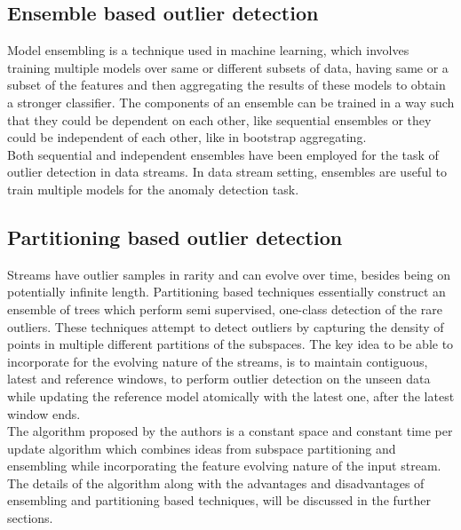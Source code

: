 \subsection{Ensemble based outlier detection}

Model ensembling is a technique used in machine learning, which involves training multiple models over same or different subsets of data, having same or a subset of the features and then aggregating the results of these models to obtain a stronger classifier. The components of an ensemble can be trained in a way such that they could be dependent on each other, like sequential ensembles\cite{RayanaZA16} or they could be independent of each other, like in bootstrap aggregating. \\

Both sequential and independent ensembles\cite{RayanaZA16}\cite{aggarwal2013outlier} have been employed for the task of outlier detection in data streams. In data stream setting, ensembles are useful to train multiple models for the anomaly detection task.

\subsection{Partitioning based outlier detection}

Streams have outlier samples in rarity and can evolve over time, besides being on potentially infinite length. Partitioning based techniques\cite{tan2011fast} essentially construct an ensemble of trees which perform semi supervised, one-class detection of the rare outliers. These techniques attempt to detect outliers by capturing the density of points in multiple different partitions of the subspaces. The key idea to be able to incorporate for the evolving nature of the streams, is to maintain contiguous, latest and reference windows, to perform outlier detection on the unseen data while updating the reference model atomically with the latest one, after the latest window ends. \\

The algorithm proposed by the authors is a constant space and constant time per update algorithm which combines ideas from subspace partitioning and ensembling while incorporating the feature evolving nature of the input stream. The details of the algorithm along with the advantages and disadvantages of ensembling and partitioning based techniques, will be discussed in the further sections.





